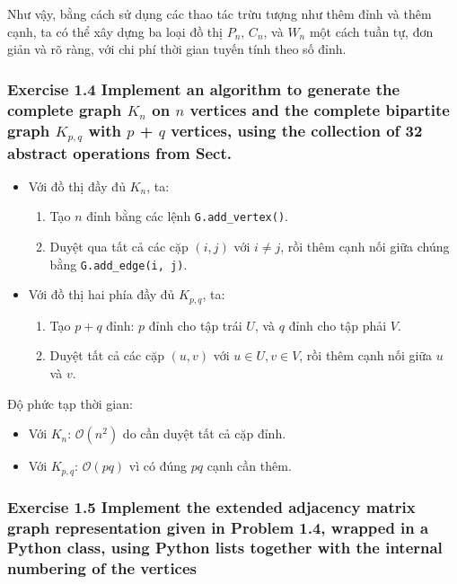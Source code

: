 \documentclass{article}
\begin{document}
	Như vậy, bằng cách sử dụng các thao tác trừu tượng như thêm đỉnh và thêm cạnh, ta có thể xây dựng ba loại đồ thị $P_n$, $C_n$, và $W_n$ một cách tuần tự, đơn giản và rõ ràng, với chi phí thời gian tuyến tính theo số đỉnh.
	
	\subsubsection*{Exercise 1.4 Implement an algorithm to generate the complete graph $K_n$ on $n$ vertices and the complete bipartite graph $K_{p,q}$ with $p$ + $q$ vertices, using the collection of 32 abstract operations from Sect.}
	
	\begin{itemize}
		\item Với đồ thị đầy đủ \(K_n\), ta:
		\begin{enumerate}
			\item Tạo \(n\) đỉnh bằng các lệnh \texttt{G.add\_vertex()}.
			\item Duyệt qua tất cả các cặp \((i, j)\) với \(i \ne j\), rồi thêm cạnh nối giữa chúng bằng \texttt{G.add\_edge(i, j)}.
		\end{enumerate}
		
		\item Với đồ thị hai phía đầy đủ \(K_{p,q}\), ta:
		\begin{enumerate}
			\item Tạo \(p+q\) đỉnh: \(p\) đỉnh cho tập trái \(U\), và \(q\) đỉnh cho tập phải \(V\).
			\item Duyệt tất cả các cặp \((u, v)\) với \(u \in U, v \in V\), rồi thêm cạnh nối giữa \(u\) và \(v\).
		\end{enumerate}
	\end{itemize}
	
	Độ phức tạp thời gian:
	
	\begin{itemize}
		\item Với \(K_n\): \(\mathcal{O}(n^2)\) do cần duyệt tất cả cặp đỉnh.
		\item Với \(K_{p,q}\): \(\mathcal{O}(pq)\) vì có đúng \(pq\) cạnh cần thêm.
	\end{itemize}

	\subsubsection*{Exercise 1.5 Implement the extended adjacency matrix graph representation given in Problem 1.4, wrapped in a Python class, using Python lists together with the internal numbering of the vertices}
	
\end{document}
